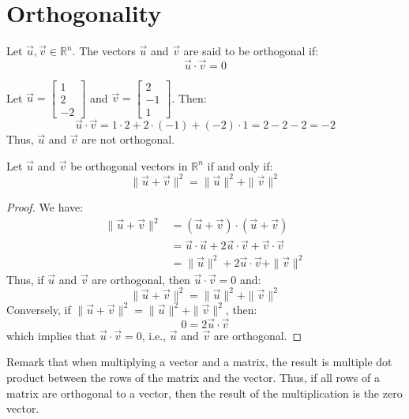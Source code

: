 \section{Orthogonality}
\begin{definition}
    Let $\vec{u}, \vec{v} \in \mathbb{R}^n$. The vectors $\vec{u}$ and $\vec{v}$ are said to be orthogonal if:
    \[
        \vec{u} \cdot \vec{v} = 0
    \]
\end{definition}

\begin{eg}
    Let $\vec{u} = \begin{bmatrix}
        1 \\ 2 \\ -2
    \end{bmatrix}$ and $\vec{v} = \begin{bmatrix}
        2 \\ -1 \\ 1
    \end{bmatrix}$. Then:
    \[
        \vec{u} \cdot \vec{v} = 1 \cdot 2 + 2 \cdot (-1) + (-2) \cdot 1 = 2 - 2 - 2 = -2
    \]
    Thus, $\vec{u}$ and $\vec{v}$ are not orthogonal.
\end{eg}

\begin{theorem}
    Let $\vec{u}$ and $\vec{v}$ be orthogonal vectors in $\mathbb{R}^n$ if and only if:
    \[
        \|\vec{u} + \vec{v}\|^2 = \|\vec{u}\|^2 + \|\vec{v}\|^2
    \]
\end{theorem}
\begin{proof}
    We have:
    \begin{align*}
        \|\vec{u} + \vec{v}\|^2 &= (\vec{u} + \vec{v}) \cdot (\vec{u} + \vec{v}) \\
        &= \vec{u} \cdot \vec{u} + 2 \vec{u} \cdot \vec{v} + \vec{v} \cdot \vec{v} \\
        &= \|\vec{u}\|^2 + 2 \vec{u} \cdot \vec{v} + \|\vec{v}\|^2
    \end{align*}
    Thus, if $\vec{u}$ and $\vec{v}$ are orthogonal, then $\vec{u} \cdot \vec{v} = 0$ and:
    \[
        \|\vec{u} + \vec{v}\|^2 = \|\vec{u}\|^2 + \|\vec{v}\|^2
    \]
    Conversely, if $\|\vec{u} + \vec{v}\|^2 = \|\vec{u}\|^2 + \|\vec{v}\|^2$, then:
    \[
        0 = 2 \vec{u} \cdot \vec{v}
    \]
    which implies that $\vec{u} \cdot \vec{v} = 0$, i.e., $\vec{u}$ and $\vec{v}$ are orthogonal.
\end{proof}
Remark that when multiplying a vector and a matrix, the result is multiple dot product between the rows of the matrix and the vector. Thus, if all rows of a matrix are orthogonal to a vector, then the result of the multiplication is the zero vector.

